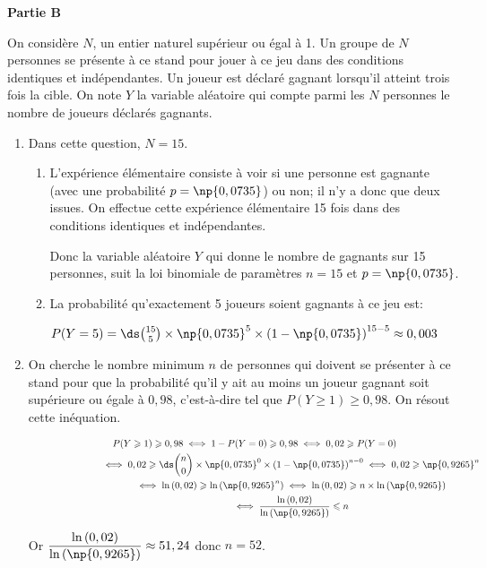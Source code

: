 \medskip

\textbf{Partie B}

\medskip

On considère $N$, un entier naturel supérieur ou égal à 1.
Un groupe de $N$ personnes se présente à ce stand pour jouer à ce jeu dans des conditions identiques et indépendantes. 
Un joueur est déclaré gagnant lorsqu'il atteint trois fois la cible.
On note $Y$ la variable aléatoire qui compte parmi les $N$ personnes le nombre de joueurs déclarés gagnants.



\begin{enumerate}
\item Dans cette question, $N = 15$.
	\begin{enumerate}
		\item 
L'expérience élémentaire consiste à voir si une personne est gagnante (avec une probabilité $p=\np{0,0735}$) ou non; il n'y a donc que deux issues.
On effectue cette expérience élémentaire	15 fois dans des conditions identiques et indépendantes.

Donc la variable aléatoire $Y$ qui donne le nombre de gagnants sur 15 personnes, suit la loi binomiale de paramètres $n=15$ et $p=\np{0,0735}$.
		
		
		\item La probabilité qu'exactement 5 joueurs soient gagnants à ce jeu est:
		
$P(Y=5)=\ds\binom{15}{5}\times \np{0,0735}^{5} \times \left (1-\np{0,0735}\right )^{15-5} \approx 0,003$
	\end{enumerate}
	
\item On cherche le nombre minimum $n$ de personnes qui doivent se présenter à ce stand pour que la probabilité qu'il y ait au moins un joueur gagnant soit supérieure ou égale à $0,98$, c'est-à-dire tel que $P(Y\geqslant 1)\geqslant 0,98$.
On résout cette inéquation.

$\begin{gathered}P(Y\geqslant 1) \geqslant 0,98
\iff
1-P(Y=0) \geqslant 0,98
\iff
0,02\geqslant P(Y=0)\\
\phantom{P(Y\geqslant 1) \geqslant 0,98}
\iff
0,02 \geqslant \ds\binom{n}{0}\times \np{0,0735}^{0} \times \left (1-\np{0,0735}\right )^{n-0}
\iff
0,02 \geqslant \np{0,9265}^n \\
\phantom{P(Y\geqslant 1) \geqslant 0,98}
\iff
\ln\left (0,02\right ) \geqslant \ln\left (\np{0,9265}^n\right )
\iff
\ln\left (0,02\right ) \geqslant n\times \ln\left (\np{0,9265}\right )\\
\phantom{P(Y\geqslant 1) \geqslant 0,98}
\iff
\dfrac{\ln\left (0,02\right )}{\ln\left (\np{0,9265}\right )} \leqslant n\end{gathered}$

Or $\dfrac{\ln\left (0,02\right )}{\ln\left (\np{0,9265}\right )}\approx 51,24$ donc $n=52$.

\end{enumerate}

\bigskip
